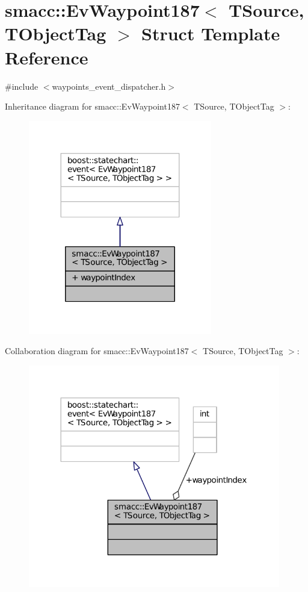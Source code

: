 \hypertarget{structsmacc_1_1EvWaypoint187}{}\section{smacc\+:\+:Ev\+Waypoint187$<$ T\+Source, T\+Object\+Tag $>$ Struct Template Reference}
\label{structsmacc_1_1EvWaypoint187}


{\ttfamily \#include $<$waypoints\+\_\+event\+\_\+dispatcher.\+h$>$}



Inheritance diagram for smacc\+:\+:Ev\+Waypoint187$<$ T\+Source, T\+Object\+Tag $>$\+:
\nopagebreak
\begin{figure}[H]
\begin{center}
\leavevmode
\includegraphics[width=227pt]{structsmacc_1_1EvWaypoint187__inherit__graph}
\end{center}
\end{figure}


Collaboration diagram for smacc\+:\+:Ev\+Waypoint187$<$ T\+Source, T\+Object\+Tag $>$\+:
\nopagebreak
\begin{figure}[H]
\begin{center}
\leavevmode
\includegraphics[width=312pt]{structsmacc_1_1EvWaypoint187__coll__graph}
\end{center}
\end{figure}
